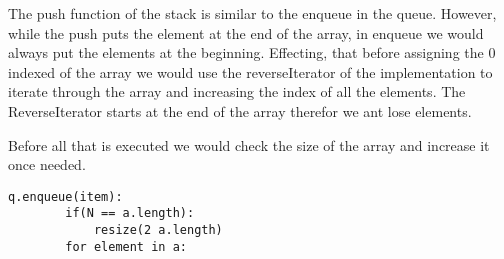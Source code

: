 \documentclass[a4paper]{article}
\begin{document}
The push function of the stack is similar to the enqueue in the queue. However, while the push puts the element at the end of the array, in enqueue we would always put the elements at the beginning. Effecting, that before assigning  the 0 indexed of the array we would use the reverseIterator of the implementation to iterate through the array and increasing the index of all the elements. The ReverseIterator starts at the end of the array therefor we ant lose elements.

Before all that is executed we would check the size of the array and increase it once needed.

\begin{lstlisting}[escapeinside={{*}{*}}]
    q.enqueue(item):
    	if(N == a.length):
    		resize(2 a.length)
    	for element in a:
    		
\end{lstlisting}
\end{document}
